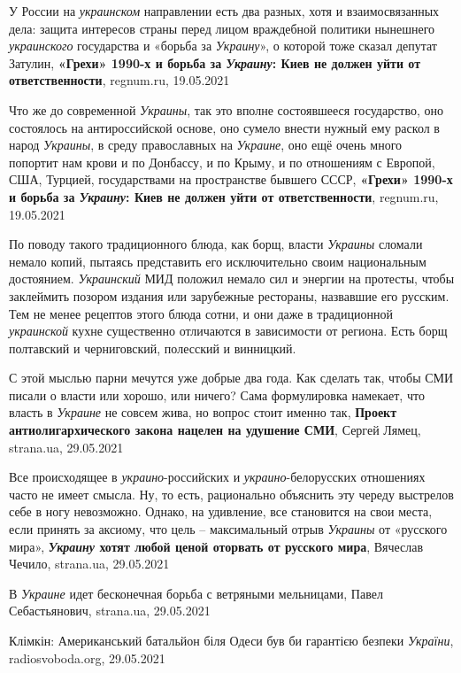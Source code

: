 У России на \emph{украинском} направлении есть два разных, хотя и
взаимосвязанных дела: защита интересов страны перед лицом враждебной политики
нынешнего \emph{украинского} государства и «борьба за \emph{Украину}», о
которой тоже сказал депутат Затулин, \textbf{«Грехи» 1990-х и борьба за
\emph{Украину}: Киев не должен уйти от ответственности}, regnum.ru, 19.05.2021

Что же до современной \emph{Украины}, так это вполне состоявшееся государство,
оно состоялось на антироссийской основе, оно сумело внести нужный ему раскол в
народ \emph{Украины}, в среду православных на \emph{Украине}, оно ещё очень
много попортит нам крови и по Донбассу, и по Крыму, и по отношениям с Европой,
США, Турцией, государствами на пространстве бывшего СССР, \textbf{«Грехи»
1990-х и борьба за \emph{Украину}: Киев не должен уйти от ответственности},
regnum.ru, 19.05.2021

По поводу такого традиционного блюда, как борщ, власти \emph{Украины} сломали
немало копий, пытаясь представить его исключительно своим национальным
достоянием.  \emph{Украинский} МИД положил немало сил и энергии на протесты,
чтобы заклеймить позором издания или зарубежные рестораны, назвавшие его
русским. Тем не менее рецептов этого блюда сотни, и они даже в традиционной
\emph{украинской} кухне существенно отличаются в зависимости от региона. Есть
борщ полтавский и черниговский, полесский и винницкий.

С этой мыслью парни мечутся уже добрые два года. Как сделать так, чтобы СМИ
писали о власти или хорошо, или ничего? Сама формулировка намекает, что власть
в \emph{Украине} не совсем жива, но вопрос стоит именно так, \textbf{Проект
антиолигархического закона нацелен на удушение СМИ}, Сергей Лямец, strana.ua,
29.05.2021


Все происходящее в \emph{украино}-российских и \emph{украино}-белорусских
отношениях часто не имеет смысла. Ну, то есть, рационально объяснить эту череду
выстрелов себе в ногу невозможно. Однако, на удивление, все становится на свои
места, если принять за аксиому, что цель – максимальный отрыв \emph{Украины} от
«русского мира», \textbf{\emph{Украину} хотят любой ценой оторвать от русского
мира}, Вячеслав Чечило, strana.ua, 29.05.2021

В \emph{Украине} идет бесконечная борьба с ветряными мельницами, Павел Себастьянович,
strana.ua, 29.05.2021

Клімкін: Американський батальйон біля Одеси був би гарантією безпеки \emph{України}, 
radiosvoboda.org, 29.05.2021

